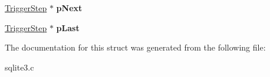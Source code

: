 \begin{DoxyCompactItemize}
\item 
\hyperlink{structTriggerStep}{Trigger\+Step} $\ast$ {\bfseries p\+Next}\hypertarget{structTriggerStep_a0757a0d22dbe2f7f57706014dd35759b}{}\label{structTriggerStep_a0757a0d22dbe2f7f57706014dd35759b}

\item 
\hyperlink{structTriggerStep}{Trigger\+Step} $\ast$ {\bfseries p\+Last}\hypertarget{structTriggerStep_a0aae9ea7f436881c0e9e614476a69584}{}\label{structTriggerStep_a0aae9ea7f436881c0e9e614476a69584}

\end{DoxyCompactItemize}


The documentation for this struct was generated from the following file\+:\begin{DoxyCompactItemize}
\item 
sqlite3.\+c\end{DoxyCompactItemize}
